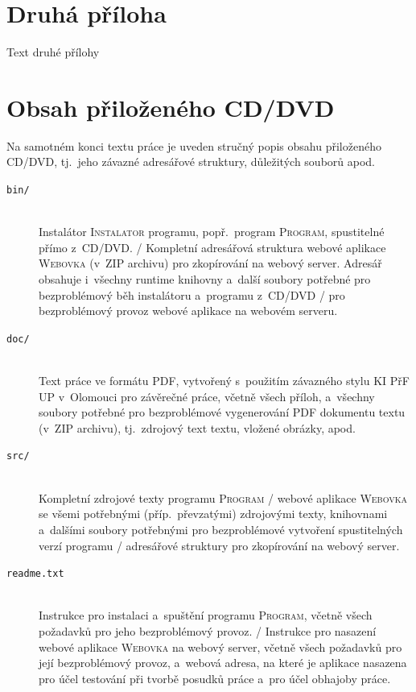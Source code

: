 \documentclass[
  master=true,
  biblatex,
  glossaries,
  index
]{kidiplom}
\begin{document}
\section{Druhá příloha}
Text druhé přílohy

\section{Obsah přiloženého CD/DVD} \label{sec:ObsahCD}

Na samotném konci textu práce je uveden stručný popis obsahu
přiloženého CD/DVD, tj.~jeho závazné adresářové struktury, důležitých
souborů apod.

\begin{description}

\item[\texttt{bin/}] \hfill \\
  Instalátor \textsc{Instalator} programu, popř.~program
  \textsc{Program}, spustitelné přímo z~CD/DVD. / Kompletní adresářová
  struktura webové aplikace \textsc{Webovka} (v~ZIP archivu) pro
  zkopírování na webový server. Adresář obsahuje i~všechny runtime
  knihovny a~další soubory potřebné pro bezproblémový běh instalátoru
  a~programu z~CD/DVD / pro bezproblémový provoz webové aplikace na
  webovém serveru.

\item[\texttt{doc/}] \hfill \\
  Text práce ve formátu PDF, vytvořený s~použitím závazného stylu KI
  PřF UP v~Olomouci pro závěrečné práce, včetně všech příloh,
  a~všechny soubory potřebné pro bezproblémové vygenerování PDF
  dokumentu textu (v~ZIP archivu), tj.~zdrojový text textu, vložené
  obrázky, apod.

\item[\texttt{src/}] \hfill \\
  Kompletní zdrojové texty programu \textsc{Program} / webové aplikace
  \textsc{Webovka} se všemi potřebnými (příp.~převzatými) zdrojovými
  texty, knihovnami a~dalšími soubory potřebnými pro bezproblémové
  vytvoření spustitelných verzí programu / adresářové struktury pro
  zkopírování na webový server.

\item[\texttt{readme.txt}] \hfill \\
  Instrukce pro instalaci a~spuštění programu \textsc{Program}, včetně
  všech požadavků pro jeho bezproblémový provoz. / Instrukce pro
  nasazení webové aplikace \textsc{Webovka} na webový server, včetně
  všech požadavků pro její bezproblémový provoz, a~webová adresa, na
  které je aplikace nasazena pro účel testování při tvorbě posudků
  práce a~pro účel obhajoby práce.

\end{description}
\end{document}
